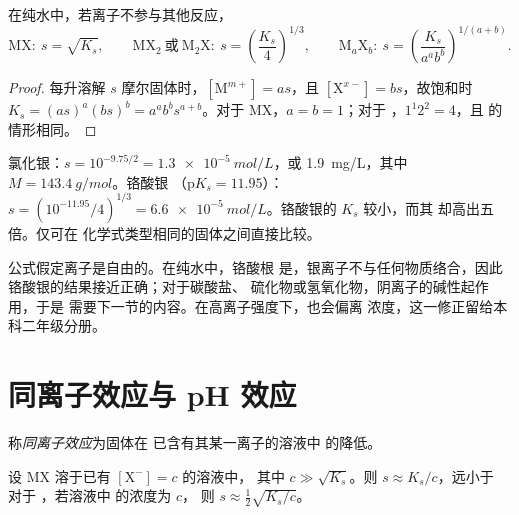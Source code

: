 \begin{proposition}[由溶度积求溶解度]\label{prop:b1:precipitation:s-of-ks}
在纯水中，若离子不参与其他反应，
\[
  \mathrm{MX}:\ s = \sqrt{K_s}, \qquad
  \mathrm{MX_2}\ \text{或}\ \mathrm{M_2X}:\ s = \left(\frac{K_s}{4}\right)^{1/3},
  \qquad
  \mathrm{M}_a\mathrm{X}_b:\ s = \left(\frac{K_s}{a^a b^b}\right)^{1/(a+b)} .
\]
\end{proposition}

\begin{proof}
每升溶解 $s$ 摩尔固体时，$[\mathrm{M}^{m+}] = as$，且
$[\mathrm{X}^{x-}] = bs$，故饱和时 $K_s = (as)^a(bs)^b =
a^a b^b s^{a+b}$。对于 MX，$a = b = 1$；对于 ，$1^1 2^2 = 4$，且
 的情形相同。
\end{proof}

\begin{example}[氯化银与铬酸银]\label{ex:b1:precipitation:agcl-ag2cro4}
氯化银：$s = 10^{-9.75/2} = \qty{1.3e-5}{mol/L}$，或
\qty{1.9}{mg/L}，其中 $M = \qty{143.4}{g/mol}$。铬酸银 
（$\mathrm{p}K_s = 11.95$）：$s = (10^{-11.95}/4)^{1/3} =
\qty{6.6e-5}{mol/L}$。铬酸银的 $K_s$ 较小，而其
却高出五倍。仅可在
化学式类型相同的固体之间直接比较。
\end{example}

\begin{remark}
公式假定离子是自由的。在纯水中，铬酸根
是，银离子不与任何物质络合，因此
铬酸银的结果接近正确；对于碳酸盐、
硫化物或氢氧化物，阴离子的碱性起作用，于是
需要下一节的内容。在高离子强度下，也会偏离
浓度，这一修正留给本科二年级分册。
\end{remark}

\section{同离子效应与 pH 效应}

\begin{definition}[同离子效应]\label{def:b1:precipitation:common-ion}
称\emph{同离子效应}为固体在
已含有其某一离子的溶液中
的降低。
\end{definition}

\begin{proposition}[含同离子时的溶解度]\label{prop:b1:precipitation:common-ion}
设 MX 溶于已有 $[\mathrm{X}^-] = c$ 的溶液中，
其中 $c \gg \sqrt{K_s}$。则 $s \approx K_s/c$，远小于
对于 ，若溶液中  的浓度为 $c$，
则 $s \approx \frac12\sqrt{K_s/c}$。
\end{proposition}

